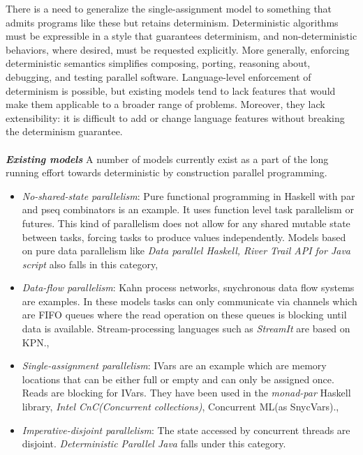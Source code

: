 \documentclass[twocolumn]{article}
\begin{document}
There is a need to generalize the single-assignment model to something that admits programs like these but retains determinism. Deterministic algorithms must be expressible in a style that guarantees determinism, and non-deterministic behaviors, where desired, must be requested explicitly. More generally, enforcing deterministic semantics simplifies composing, porting, reasoning about, debugging, and testing parallel software. Language-level enforcement of determinism is possible, but existing models tend to lack features that would make them applicable to a broader range of problems. Moreover, they lack extensibility: it is difficult to add or change language features without breaking the determinism guarantee. \\ \\
\textit{\textbf{Existing models}} A number of models currently exist as a part of the long running effort towards deterministic by construction parallel programming. \par
\begin{itemize}
        \item \textit{No-shared-state parallelism}: Pure functional programming in Haskell with par and pseq combinators is an example. It uses function level task parallelism or futures. This kind of parallelism does not allow for any shared mutable state between tasks, forcing tasks to produce values independently. Models based on pure data parallelism like \textit{Data parallel Haskell, River Trail API for Java script} also falls in this category,
        \item \textit{Data-flow parallelism}: Kahn process networks, snychronous data flow systems are examples. In these models tasks can only communicate via channels which are FIFO queues where the read operation on these queues is blocking until data is available. Stream-processing languages such as \textit{StreamIt} are based on KPN., 
        \item \textit{Single-assignment parallelism}: IVars are an example which are memory locations that can be either full or empty and can only be assigned once. Reads are blocking for IVars. They have been used in the \textit{monad-par} Haskell library, \textit{Intel CnC(Concurrent collections)}, Concurrent ML(as SnycVars).,
        \item \textit{Imperative-disjoint parallelism}: The state accessed by concurrent threads are disjoint. \textit{Deterministic Parallel Java} falls under this category.     
\end{itemize} 
\end{document}
